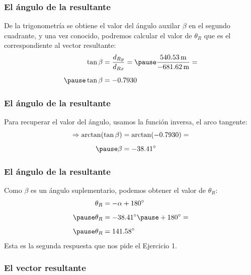 \documentclass[12pt]{beamer}
\begin{document}
\begin{frame}
\frametitle{El ángulo de la resultante}
De la trigonometría se obtiene el valor del ángulo auxilar $\beta$ en el segundo cuadrante, \pause y una vez conocido, podremos calcular el valor de $\theta_{R}$ que es el correspondiente al vector resultante:
\pause
\begin{eqnarray*}
\begin{aligned}
\tan \beta &= \dfrac{d_{Ry}}{d_{Rx}} = \pause \dfrac{\SI{540.53}{\meter}}{- \SI{681.62}{\meter}} = \\[0.5em] \pause
\tan \beta &= - 0.7930
\end{aligned}
\end{eqnarray*}
\end{frame}
\begin{frame}
\frametitle{El ángulo de la resultante}
Para recuperar el valor del ángulo, usamos la función inversa, el arco tangente:
\pause
\begin{eqnarray*}
\begin{aligned}
\Rightarrow \arctan(\tan \beta) &= \arctan (-0.7930) = \\[0.5em] \pause
\beta &= - \ang{38.41}
\end{aligned}
\end{eqnarray*}
\end{frame}
\begin{frame}
\frametitle{El ángulo de la resultante}
Como $\beta$ es un ángulo suplementario, \pause podemos obtener el valor de $\theta_{R}$:
\pause
\begin{eqnarray*}
\begin{aligned}
\theta_{R} &= -\alpha + \ang{180} \\[0.5em] \pause
\theta_{R} &= - \ang{38.41} \pause + \ang{180} = \\[0.5em] \pause
\theta_{R} &= \ang{141.58}
\end{aligned}
\end{eqnarray*}
\pause
Esta es la segunda respuesta que nos pide el Ejercicio 1.
\end{frame}
\begin{frame}
\frametitle{El vector resultante}
\begin{figure}
    \centering
\end{figure}
\end{frame}
\end{document}
